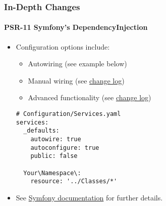 
\begin{frame}[fragile]
	\frametitle{In-Depth Changes}
	\framesubtitle{PSR-11 Symfony's DependencyInjection}

	\lstset{basicstyle=\tiny\ttfamily}

	\begin{itemize}
		\item Configuration options include:

			\begin{itemize}
				\item Autowiring (see example below)
				\item Manual wiring
					(see \href{https://docs.typo3.org/c/typo3/cms-core/master/en-us/Changelog/10.0/Feature-84112-SymfonyDependencyInjectionForCoreAndExtbase.html}{change log})
				\item Advanced functionality
					(see \href{https://docs.typo3.org/c/typo3/cms-core/master/en-us/Changelog/10.0/Feature-84112-SymfonyDependencyInjectionForCoreAndExtbase.html}{change log})
			\end{itemize}
\begin{lstlisting}
# Configuration/Services.yaml
services:
  _defaults:
    autowire: true
    autoconfigure: true
    public: false

  Your\Namespace\:
    resource: '../Classes/*'
\end{lstlisting}

		\item See \href{https://symfony.com/doc/current/service_container.html}{Symfony documentation} for further details.

	\end{itemize}

\end{frame}


